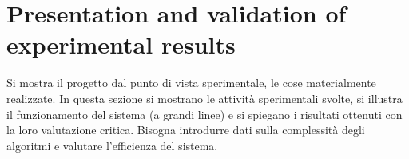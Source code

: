 \chapter{Presentation and validation of experimental results }
\label{capitolo6}
\thispagestyle{empty}



\noindent Si mostra il progetto dal punto di vista sperimentale, le cose materialmente realizzate. In questa sezione si mostrano le attivit\`a sperimentali svolte, si illustra il funzionamento del sistema (a grandi linee) e si spiegano i risultati ottenuti con la loro valutazione critica. Bisogna introdurre dati sulla complessit\`a degli algoritmi e valutare l'efficienza del sistema.